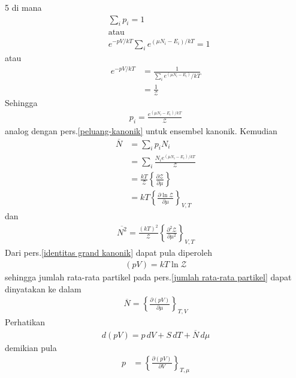 \documentclass[a4paper  , 6 pt]{article}
\begin{document}
\begin{tiny}
\begin{multicols} {5}
di mana 
\begin{align}
&\sum_i p_i  = 1  \\
& \text{atau } \\
 &  e^{- pV /kT} \sum_i e^{(\mu N_i  - E_i )/kT} = 1
\end{align}
atau 
\begin{align}
  e^{- pV/kT}& = \frac{1}{\sum_i e^(\mu N_i - E_i )/kT} \nonumber  \\
&  = \frac{1}{\boldsymbol{\mathcal{Z}} } \label{identitas grand kanonik}
\end{align}
Sehingga 
\begin{align}
p_i = \frac{e^{(\mu N_i - E_i )/kT}}{\boldsymbol{\mathcal{Z}}} 
\end{align}
analog dengan pers.\ref{peluang-kanonik} untuk ensembel kanonik.\newline 
Kemudian 
\begin{align}
\overline{N}& =  \sum_i p_i N_i \nonumber \\
 & = \sum_i \frac{N_i e^{(\mu N_i - E_i )/kT}}{\boldsymbol{\mathcal{Z}}} \nonumber \\
& = \frac{kT}{\boldsymbol{\mathcal{Z}}} \left \lbrace \frac{\partial \boldsymbol{\mathcal{Z}}}{\partial \mu }\right \rbrace \nonumber \\
& = kT \left \lbrace \frac{\partial \ln \boldsymbol{\mathcal{Z}}}{\partial \mu} \right \rbrace_{V,T} 
  \label{jumlah rata-rata partikel}
\end{align}
dan 
\begin{align}
\overline{N^2} = \frac{(kT)^2}{\boldsymbol{\mathcal{Z}}} \left \lbrace 
\frac{\partial^2 \boldsymbol{ \mathcal{Z}}}{\partial \mu^2 } \right \rbrace_{V,T} \label{jumlah rata-rata kuadrat partikel}  
\end{align}
Dari pers.\ref{identitas grand kanonik} dapat pula diperoleh
\begin{align}
(pV) = kT \ln \boldsymbol{\mathcal{Z}} 
\end{align}
sehingga jumlah rata-rata partikel pada pers.\ref{jumlah rata-rata partikel} dapat dinyatakan ke dalam
\begin{align}
\overline{ N} = \left \lbrace \frac{\partial (pV)}{\partial \mu } \right \rbrace_{T,V} 
\end{align}
Perhatikan
\begin{align}
d(pV) = p\,  dV  + S \, d T + \overline{N} \, d \mu 
\end{align}
demikian pula 
\begin{align}
p & = \left \lbrace \frac{\partial (pV)}{\partial V} \right \rbrace_{T, \mu}

\end{align}
\end{multicols}
\end{tiny}
\end{document}
